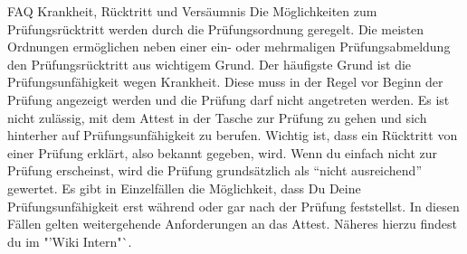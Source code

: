 \begin{artikel}{FAQ Krankheit, Rücktritt und Versäumnis}
Die Möglichkeiten zum Prüfungsrücktritt werden durch die Prüfungsordnung geregelt. Die meisten Ordnungen ermöglichen neben einer ein- oder mehrmaligen Prüfungsabmeldung den Prüfungsrücktritt aus wichtigem Grund. Der häufigste Grund ist die Prüfungsunfähigkeit wegen Krankheit. Diese muss in der Regel vor Beginn der Prüfung angezeigt werden und die Prüfung darf nicht angetreten werden. Es ist nicht zulässig, mit dem Attest in der Tasche zur Prüfung zu gehen und sich hinterher auf Prüfungsunfähigkeit zu berufen.
Wichtig ist, dass ein Rücktritt von einer Prüfung erklärt, also bekannt gegeben, wird. Wenn du einfach nicht zur Prüfung erscheinst, wird die Prüfung grundsätzlich als "`nicht ausreichend"' gewertet.
Es gibt in Einzelfällen die Möglichkeit, dass Du Deine Prüfungsunfähigkeit erst während oder gar nach der Prüfung feststellst. In diesen Fällen gelten weitergehende Anforderungen an das Attest. Näheres hierzu findest du im "'Wiki Intern"`.
\end{artikel}
